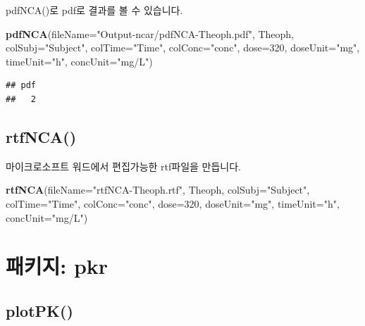 \documentclass[12pt,]{krantz}
\newenvironment{Shaded}{\begin{snugshade}}{\end{snugshade}}
\newcommand{\KeywordTok}[1]{\textcolor[rgb]{0.13,0.29,0.53}{\textbf{#1}}}
\newcommand{\DataTypeTok}[1]{\textcolor[rgb]{0.13,0.29,0.53}{#1}}
\newcommand{\DecValTok}[1]{\textcolor[rgb]{0.00,0.00,0.81}{#1}}
\newcommand{\StringTok}[1]{\textcolor[rgb]{0.31,0.60,0.02}{#1}}
\newcommand{\NormalTok}[1]{#1}
\begin{document}
pdfNCA()로 pdf로 결과를 볼 수 있습니다.

\begin{Shaded}
\begin{Highlighting}[]
\KeywordTok{pdfNCA}\NormalTok{(}\DataTypeTok{fileName=}\StringTok{"Output-ncar/pdfNCA-Theoph.pdf"}\NormalTok{, Theoph, }\DataTypeTok{colSubj=}\StringTok{"Subject"}\NormalTok{, }\DataTypeTok{colTime=}\StringTok{"Time"}\NormalTok{, }
       \DataTypeTok{colConc=}\StringTok{"conc"}\NormalTok{, }\DataTypeTok{dose=}\DecValTok{320}\NormalTok{, }\DataTypeTok{doseUnit=}\StringTok{"mg"}\NormalTok{, }\DataTypeTok{timeUnit=}\StringTok{"h"}\NormalTok{, }\DataTypeTok{concUnit=}\StringTok{"mg/L"}\NormalTok{)}
\end{Highlighting}
\end{Shaded}

\begin{verbatim}
## pdf 
##   2
\end{verbatim}

\hypertarget{rtfnca}{%
\section{rtfNCA()}\label{rtfnca}}

마이크로소프트 워드에서 편집가능한 rtf파일을 만듭니다.

\begin{Shaded}
\begin{Highlighting}[]
\KeywordTok{rtfNCA}\NormalTok{(}\DataTypeTok{fileName=}\StringTok{"rtfNCA-Theoph.rtf"}\NormalTok{, Theoph, }\DataTypeTok{colSubj=}\StringTok{"Subject"}\NormalTok{, }\DataTypeTok{colTime=}\StringTok{"Time"}\NormalTok{, }
       \DataTypeTok{colConc=}\StringTok{"conc"}\NormalTok{, }\DataTypeTok{dose=}\DecValTok{320}\NormalTok{, }\DataTypeTok{doseUnit=}\StringTok{"mg"}\NormalTok{, }\DataTypeTok{timeUnit=}\StringTok{"h"}\NormalTok{, }\DataTypeTok{concUnit=}\StringTok{"mg/L"}\NormalTok{)}
\end{Highlighting}
\end{Shaded}

\hypertarget{-pkr}{%
\chapter{패키지: pkr}\label{-pkr}}

\hypertarget{plotpk}{%
\section{plotPK()}\label{plotpk}}
\end{document}
